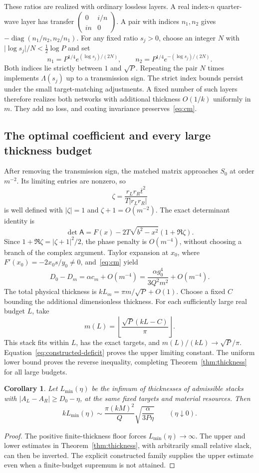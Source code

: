 \documentclass[11pt,a4paper]{article}
\newtheorem{corollary}[theorem]{Corollary}
\theoremstyle{remark}
\newcommand{\abs}[1]{\lvert #1\rvert}
\newcommand{\diag}{\operatorname{diag}}
\begin{document}
These ratios are realized with ordinary lossless layers. A real index-$n$ quarter-wave layer has transfer $\left(\begin{smallmatrix}0&i/n\\in&0\end{smallmatrix}\right)$. A pair with indices $n_1,n_2$ gives $-\diag(n_1/n_2,n_2/n_1)$. For any fixed ratio $s_j>0$, choose an integer $N$ with $\abs{\log s_j}/N<\tfrac12\log P$ and set
\[
 n_1=P^{1/4}e^{(\log s_j)/(2N)},\qquad
 n_2=P^{1/4}e^{-(\log s_j)/(2N)}.
\]
Both indices lie strictly between $1$ and $\sqrt P$. Repeating the pair $N$ times implements $\Lambda(s_j)$ up to a transmission sign. The strict index bounds persist under the small target-matching adjustments. A fixed number of such layers therefore realizes both networks with additional thickness $O(1/k)$ uniformly in $m$. They add no loss, and coating invariance preserves~\eqref{eq:cm}.

\subsection{The optimal coefficient and every large thickness budget}
After removing the transmission sign, the matched matrix approaches $S_0$ at order $m^{-2}$. Its limiting entries are nonzero, so
\[
 \zeta=\frac{r_Lr_R\overline{t}^{2}}{T\abs{r_Lr_R}}
\]
is well defined with $\abs\zeta=1$ and $\zeta+1=O(m^{-2})$. The exact determinant identity is
\[
 \det\mathsf A=F(x)-2T\sqrt{b^2-x^2}(1+\Re\zeta).
\]
Since $1+\Re\zeta=\abs{\zeta+1}^2/2$, the phase penalty is $O(m^{-4})$, without choosing a branch of the complex argument. Taylor expansion at $x_0$, where $F'(x_0)=-2x_0s/y_0\ne0$, and~\eqref{eq:cm} yield
\begin{equation}\label{eq:constructed-deficit}
 D_0-D_m=\alpha c_m+O(m^{-4})
 =\frac{\alpha g_0^4}{3Q^2m^2}+O(m^{-4}).
\end{equation}
The total physical thickness is $kL_m=\pi m/\sqrt P+O(1)$. Choose a fixed $C$ bounding the additional dimensionless thickness. For each sufficiently large real budget $L$, take
\[
 m(L)=\left\lfloor\frac{\sqrt P(kL-C)}\pi\right\rfloor.
\]
This stack fits within $L$, has the exact targets, and $m(L)/(kL)\to\sqrt P/\pi$. Equation~\eqref{eq:constructed-deficit} proves the upper limiting constant. The uniform lower bound proves the reverse inequality, completing Theorem~\ref{thm:thickness} for all large budgets.

\begin{corollary}\label{cor:min-thickness}
Let $L_{\min}(\eta)$ be the infimum of thicknesses of admissible stacks with $\abs{A_L-A_R}\geq D_0-\eta$, at the same fixed targets and material resources. Then
\[
 kL_{\min}(\eta)\sim\frac{\pi(kM)^2}{Q}\sqrt{\frac\alpha{3P\eta}}
 \qquad(\eta\downarrow0).
\]
\end{corollary}
\begin{proof}
The positive finite-thickness floor forces $L_{\min}(\eta)\to\infty$. The upper and lower estimates in Theorem~\ref{thm:thickness}, with arbitrarily small relative slack, can then be inverted. The explicit constructed family supplies the upper estimate even when a finite-budget supremum is not attained.
\end{proof}
\end{document}
